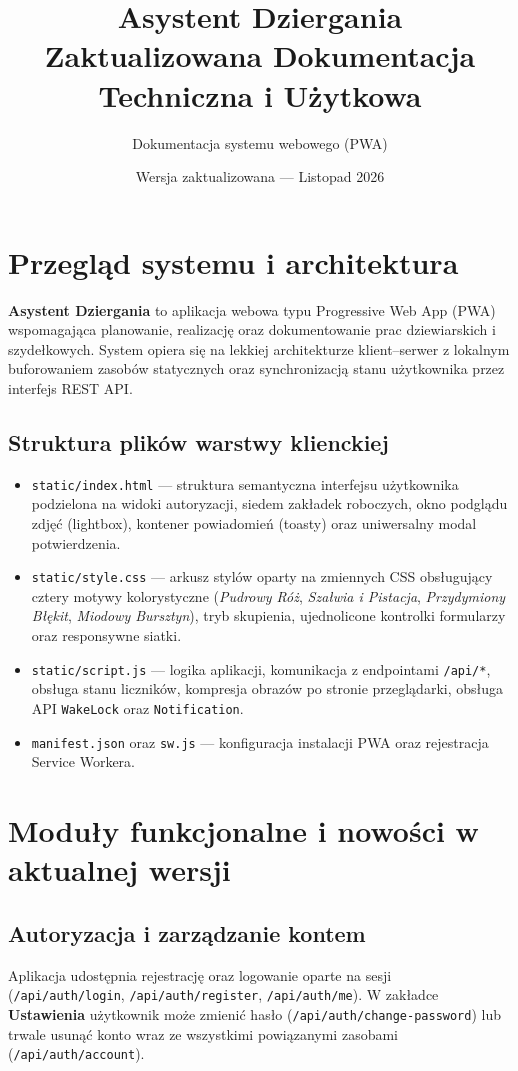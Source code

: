 \documentclass[11pt, a4paper]{article}
\title{\textbf{\textcolor{roseaccent}{Asystent Dziergania}}\\[4pt]
\large Zaktualizowana Dokumentacja Techniczna i Użytkowa}
\author{Dokumentacja systemu webowego (PWA)}
\date{Wersja zaktualizowana — Listopad 2026}
\begin{document}
\maketitle
\tableofcontents
\newpage

\section{Przegląd systemu i architektura}
\textbf{Asystent Dziergania} to aplikacja webowa typu Progressive Web App (PWA) wspomagająca planowanie, realizację oraz dokumentowanie prac dziewiarskich i szydełkowych. System opiera się na lekkiej architekturze klient--serwer z lokalnym buforowaniem zasobów statycznych oraz synchronizacją stanu użytkownika przez interfejs REST API.

\subsection{Struktura plików warstwy klienckiej}
\begin{itemize}
  \item \texttt{static/index.html} --- struktura semantyczna interfejsu użytkownika podzielona na widoki autoryzacji, siedem zakładek roboczych, okno podglądu zdjęć (lightbox), kontener powiadomień (toasty) oraz uniwersalny modal potwierdzenia.
  \item \texttt{static/style.css} --- arkusz stylów oparty na zmiennych CSS obsługujący cztery motywy kolorystyczne (\textit{Pudrowy Róż}, \textit{Szałwia i Pistacja}, \textit{Przydymiony Błękit}, \textit{Miodowy Bursztyn}), tryb skupienia, ujednolicone kontrolki formularzy oraz responsywne siatki.
  \item \texttt{static/script.js} --- logika aplikacji, komunikacja z endpointami \texttt{/api/*}, obsługa stanu liczników, kompresja obrazów po stronie przeglądarki, obsługa API \texttt{WakeLock} oraz \texttt{Notification}.
  \item \texttt{manifest.json} oraz \texttt{sw.js} --- konfiguracja instalacji PWA oraz rejestracja Service Workera.
\end{itemize}

\vspace{4ex}
\section{Moduły funkcjonalne i nowości w aktualnej wersji}

\subsection{Autoryzacja i zarządzanie kontem}
Aplikacja udostępnia rejestrację oraz logowanie oparte na sesji (\texttt{/api/auth/login}, \texttt{/api/auth/register}, \texttt{/api/auth/me}). W zakładce \textbf{Ustawienia} użytkownik może zmienić hasło (\texttt{/api/auth/change-password}) lub trwale usunąć konto wraz ze wszystkimi powiązanymi zasobami (\texttt{/api/auth/account}).
\end{document}
